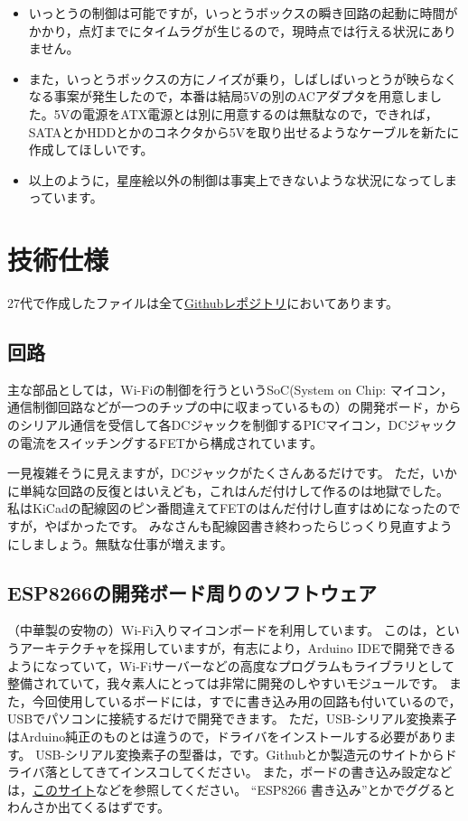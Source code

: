 \documentclass[letterpaper,10pt,dvipdfmx]{sphinxmanual}
\begin{document}
\begin{itemize}
\item {} 
いっとうの制御は可能ですが，いっとうボックスの瞬き回路の起動に時間がかかり，点灯までにタイムラグが生じるので，現時点では行える状況にありません。

\item {} 
また，いっとうボックスの方にノイズが乗り，しばしばいっとうが映らなくなる事案が発生したので，本番は結局5Vの別のACアダプタを用意しました。5Vの電源をATX電源とは別に用意するのは無駄なので，できれば，SATAとかHDDとかのコネクタから5Vを取り出せるようなケーブルを新たに作成してほしいです。

\item {} 
以上のように，星座絵以外の制御は事実上できないような状況になってしまっています。

\end{itemize}


\section{技術仕様}
\label{\detokenize{wireless/piscium:id4}}
27代で作成したファイルは全て\href{https://github.com/macv35/nichiden27}{Githubレポジトリ}においてあります。


\subsection{回路}
\label{\detokenize{wireless/piscium:id5}}
主な部品としては，Wi-Fiの制御を行うというSoC(System on
Chip:
マイコン，通信制御回路などが一つのチップの中に収まっているもの）の開発ボード，からのシリアル通信を受信して各DCジャックを制御するPICマイコン，DCジャックの電流をスイッチングするFETから構成されています。

一見複雑そうに見えますが，DCジャックがたくさんあるだけです。
ただ，いかに単純な回路の反復とはいえども，これはんだ付けして作るのは地獄でした。
私はKiCadの配線図のピン番間違えてFETのはんだ付けし直すはめになったのですが，やばかったです。
みなさんも配線図書き終わったらじっくり見直すようにしましょう。無駄な仕事が増えます。


\subsection{ESP8266の開発ボード周りのソフトウェア}
\label{\detokenize{wireless/piscium:esp8266}}
（中華製の安物の）Wi-Fi入りマイコンボードを利用しています。
このは，というアーキテクチャを採用していますが，有志により，Arduino
IDEで開発できるようになっていて，Wi-Fiサーバーなどの高度なプログラムもライブラリとして整備されていて，我々素人にとっては非常に開発のしやすいモジュールです。
また，今回使用しているボードには，すでに書き込み用の回路も付いているので，USBでパソコンに接続するだけで開発できます。
ただ，USB-シリアル変換素子はArduino純正のものとは違うので，ドライバをインストールする必要があります。
USB-シリアル変換素子の型番は，です。Githubとか製造元のサイトからドライバ落としてきてインスコしてください。
また，ボードの書き込み設定などは，\href{http://trac.switch-science.com/wiki/esp\_dev\_arduino\_ide}{このサイト}などを参照してください。
``ESP8266 書き込み''とかでググるとわんさか出てくるはずです。
\end{document}
